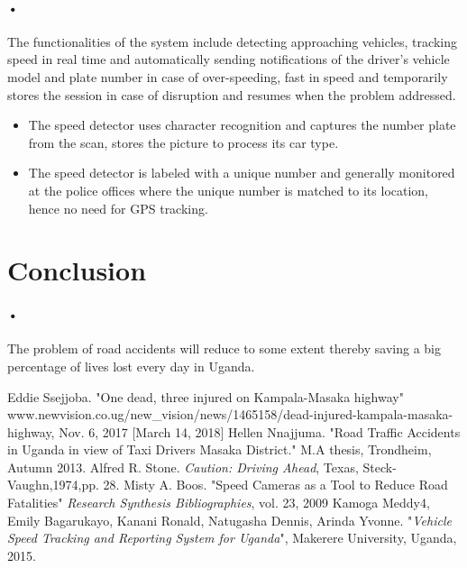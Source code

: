 \documentclass[12pt]{report}
\begin{document}
\paragraph{•}
The functionalities of the system include detecting approaching vehicles, tracking speed in real time and automatically sending notifications of the driver's vehicle model and plate number in case of over-speeding, fast in speed and temporarily stores the session in case of disruption and resumes when the problem addressed.
\begin{itemize}
\item The speed detector uses character recognition and captures the number plate from the scan, stores the picture to process its car type.
\item The speed detector is labeled with a unique number and generally monitored at the police offices where the unique number is matched to its location, hence no need for GPS tracking.
\end{itemize}
\section{Conclusion}
\paragraph{•}
The problem of road accidents will reduce to some extent thereby saving a big percentage of lives lost every day in Uganda.
\begin{thebibliography}{9}
 Eddie Ssejjoba. "One dead, three injured on Kampala-Masaka highway" www.newvision.co.ug/new\_vision/news/1465158/dead-injured-kampala-masaka-highway, Nov. 6, 2017 [March 14, 2018]
 Hellen Nnajjuma. "Road Traffic Accidents in Uganda in view of Taxi Drivers Masaka District." M.A thesis, Trondheim, Autumn 2013.
 Alfred R. Stone. \textit{Caution: Driving Ahead}, Texas, 
Steck-Vaughn,1974,pp. 28.
 Misty A. Boos. "Speed Cameras as a Tool to Reduce Road Fatalities" \textit{Research Synthesis Bibliographies}, vol. 23, 2009
 Kamoga Meddy4, Emily Bagarukayo, Kanani Ronald, Natugasha Dennis, Arinda Yvonne. "\textit{Vehicle Speed Tracking and Reporting System for Uganda}", Makerere University, Uganda, 2015.

\end{thebibliography}
\end{document}
